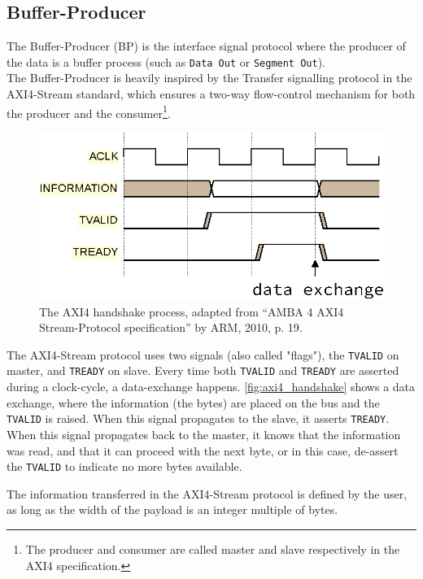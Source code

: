 \subsection{Buffer-Producer}
The Buffer-Producer (BP) is the interface signal protocol where the producer of
the data is a buffer process (such as \texttt{Data Out} or \texttt{Segment
Out}).\\
The Buffer-Producer is heavily inspired by the Transfer signalling protocol in
the AXI4-Stream standard, which ensures a two-way flow-control mechanism for both
the producer and the consumer\footnote{The producer and consumer are called
master and slave respectively in the AXI4 specification.}\cite{arm_axi4}.

\begin{figure}[h]
\centering
\includegraphics[width=\linewidth]{implementation/axi4_handshake.eps}
\caption{The AXI4 handshake process, adapted from “AMBA 4 AXI4 Stream-Protocol
	specification” by ARM, 2010, p. 19.\cite{arm_axi4}}
\label{fig:axi4_handshake}
\end{figure}

The AXI4-Stream protocol uses two signals (also called "flags"), the \texttt{TVALID}
on master, and \texttt{TREADY} on slave. Every time both \texttt{TVALID} and
\texttt{TREADY} are asserted during a clock-cycle, a data-exchange happens.
\autoref{fig:axi4_handshake} shows a data exchange, where the information
(the bytes) are placed on the bus and the \texttt{TVALID} is raised. When this
signal propagates to the slave, it asserts \texttt{TREADY}. When this signal
propagates back to the master, it knows that the information was read, and that
it can proceed with the next byte, or in this case, de-assert the
\texttt{TVALID} to indicate no more bytes available\cite{arm_axi4}.

The information transferred in the AXI4-Stream protocol is defined by the user,
as long as the width of the payload is an integer multiple of
bytes\cite{arm_axi4}.\\

